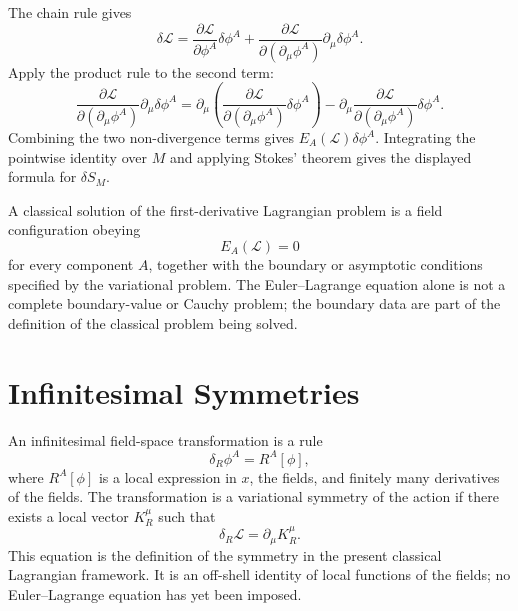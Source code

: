 The chain rule gives
\[
  \delta\mathcal L
  =
  \frac{\partial\mathcal L}{\partial\phi^A}\delta\phi^A
  +
  \frac{\partial\mathcal L}{\partial(\partial_\mu\phi^A)}
  \partial_\mu\delta\phi^A .
\]
Apply the product rule to the second term:
\[
  \frac{\partial\mathcal L}{\partial(\partial_\mu\phi^A)}
  \partial_\mu\delta\phi^A
  =
  \partial_\mu
  \left(
    \frac{\partial\mathcal L}{\partial(\partial_\mu\phi^A)}
    \delta\phi^A
  \right)
  -
  \partial_\mu
  \frac{\partial\mathcal L}{\partial(\partial_\mu\phi^A)}
  \delta\phi^A .
\]
Combining the two non-divergence terms gives \(E_A(\mathcal L)\delta\phi^A\).
Integrating the pointwise identity over \(M\) and applying Stokes' theorem
gives the displayed formula for \(\delta S_M\).

\begin{definition}
\label{def:classical-solution-euler-lagrange}
A classical solution of the first-derivative Lagrangian problem is a field
configuration obeying
\[
  E_A(\mathcal L)=0
\]
for every component \(A\), together with the boundary or asymptotic conditions
specified by the variational problem.  The Euler--Lagrange equation alone is
not a complete boundary-value or Cauchy problem; the boundary data are part of
the definition of the classical problem being solved.
\end{definition}

\section{Infinitesimal Symmetries}

\begin{definition}
\label{def:infinitesimal-variational-symmetry}
An infinitesimal field-space transformation is a rule
\[
  \delta_R\phi^A=R^A[\phi],
\]
where \(R^A[\phi]\) is a local expression in \(x\), the fields, and finitely
many derivatives of the fields.  The transformation is a variational symmetry
of the action if there exists a local vector \(K_R^\mu\) such that
\[
  \delta_R\mathcal L=\partial_\mu K_R^\mu .
\]
This equation is the definition of the symmetry in the present classical
Lagrangian framework.  It is an off-shell identity of local functions of the
fields; no Euler--Lagrange equation has yet been imposed.
\end{definition}

